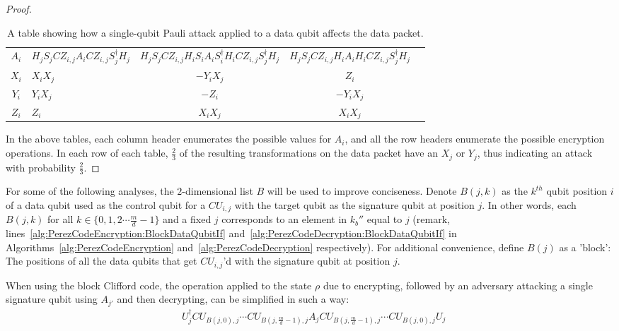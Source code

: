 \begin{proof}
\begin{table}[H]
\caption{A table showing how a single-qubit Pauli attack applied to a data qubit affects the data packet. \label{table:dataQubitAttackTransformation3}}
\begin{adjustwidth}{-3.25cm}{-3.25cm} 
\begin{center}
\begin{tabular}{ |cV{4}c|c|c| }
\hline
$A_{i}$ & $H_jS_j\mathit{CZ}_{i,j}A_i\mathit{CZ}_{i,j}S_j^{\dagger}H_j$ & $H_jS_j\mathit{CZ}_{i,j}H_{i} S_{i}A_iS_i^{\dagger}H_i\mathit{CZ}_{i,j}S_j^{\dagger}H_j$ & $H_jS_j\mathit{CZ}_{i,j}H_iA_iH_i\mathit{CZ}_{i,j}S_j^{\dagger}H_j$\\
 $X_{i}$ & $X_iX_j$ & $-Y_iX_j$ & $Z_i$\\
\hline $Y_{i}$ & $Y_iX_j$ & $-Z_i$ & $-Y_iX_j$\\
\hline $Z_{i}$ & $Z_i$ & $X_iX_j$ & $X_iX_j$\\
\hline
\end{tabular}
\end{center}
\end{adjustwidth}
\end{table}
In the above tables, each column header enumerates the possible values for $A_i$, and all the row headers enumerate the possible encryption operations. In each row of each table, $\frac{2}{3}$ of the resulting transformations on the data packet have an $X_j$ or $Y_j$, thus indicating an attack with probability $\frac{2}{3}$.
\end{proof}
For some of the following analyses, the $2$-dimensional list $B$ will be used to improve conciseness. Denote $B(j,k)$ as the $k^{th}$ qubit position $i$ of a data qubit used as the control qubit for a $\mathit{CU}_{i,j}$ with the target qubit as the signature qubit at position $j$. In other words, each $B(j,k)$ for all $k \in \{0,1,2 \cdots \frac{m}{d} - 1\}$ and a fixed $j$ corresponds to an element in $k_b''$ equal to $j$ (remark, lines~\ref{alg:PerezCodeEncryption:BlockDataQubitIf} and~\ref{alg:PerezCodeDecryption:BlockDataQubitIf} in Algorithms~\ref{alg:PerezCodeEncryption} and~\ref{alg:PerezCodeDecryption} respectively). For additional convenience, define $B(j)$ as a 'block': The positions of all the data qubits that get $\mathit{CU}_{i,j}$'d with the signature qubit at position $j$.
\begin{myLemmarep}
\label{lemma:integrityEncryptionRearrangement2}
When using the block Clifford code, the operation applied to the state $\rho$ due to encrypting, followed by an adversary attacking a single signature qubit using $A_{j'}$ and then decrypting, can be simplified in such a way:
\begin{align}
&U_j^{\dagger}\mathit{CU}_{B(j,0),j} \cdots \mathit{CU}_{B(j,\frac{m}{d}-1),j} A_{j} \mathit{CU}_{B(j,\frac{m}{d}-1),j} \cdots \mathit{CU}_{B(j,0),j} U_j \label{eq:integrityEncryptionRearrangement2}
\end{align}
\end{myLemmarep}
